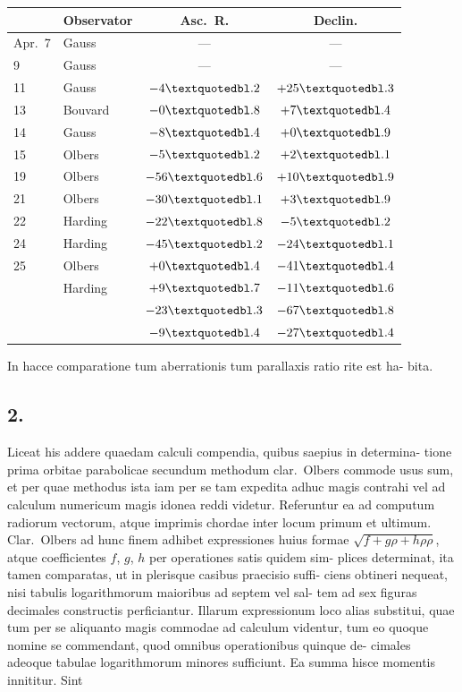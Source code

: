 \documentclass[12pt,a4paper]{article}
\begin{document}
\begin{center}
\small
\begin{tabular}{@{}llcc@{}}
\toprule
& Observator & Asc.\ R. & Declin. \\
\midrule
Apr.\ 7 & Gauss & --- & --- \\
9 & Gauss & --- & --- \\
11 & Gauss & $-4\textquotedbl.2$ & $+25\textquotedbl.3$ \\
13 & Bouvard & $-0\textquotedbl.8$ & $+7\textquotedbl.4$ \\
14 & Gauss & $-8\textquotedbl.4$ & $+0\textquotedbl.9$ \\
15 & Olbers & $-5\textquotedbl.2$ & $+2\textquotedbl.1$ \\
19 & Olbers & $-56\textquotedbl.6$ & $+10\textquotedbl.9$ \\
21 & Olbers & $-30\textquotedbl.1$ & $+3\textquotedbl.9$ \\
22 & Harding & $-22\textquotedbl.8$ & $-5\textquotedbl.2$ \\
24 & Harding & $-45\textquotedbl.2$ & $-24\textquotedbl.1$ \\
25 & Olbers & $+0\textquotedbl.4$ & $-41\textquotedbl.4$ \\
& Harding & $+9\textquotedbl.7$ & $-11\textquotedbl.6$ \\
& & $-23\textquotedbl.3$ & $-67\textquotedbl.8$ \\
& & $-9\textquotedbl.4$ & $-27\textquotedbl.4$ \\
\bottomrule
\end{tabular}
\end{center}

In hacce comparatione tum aberrationis tum parallaxis ratio rite est ha-
bita.

\subsection*{2.}

Liceat his addere quaedam calculi compendia, quibus saepius in determina-
tione prima orbitae parabolicae secundum methodum clar.\ Olbers commode usus
sum, et per quae methodus ista iam per se tam expedita adhuc magis contrahi
vel ad calculum numericum magis idonea reddi videtur. Referuntur ea ad
computum radiorum vectorum, atque imprimis chordae inter locum primum
et ultimum. Clar.\ Olbers ad hunc finem adhibet expressiones huius formae
$\sqrt{f + g\rho + h\rho\rho}$, atque coefficientes $f$, $g$, $h$ per operationes satis quidem sim-
plices determinat, ita tamen comparatas, ut in plerisque casibus praecisio suffi-
ciens obtineri nequeat, nisi tabulis logarithmorum maioribus ad septem vel sal-
tem ad sex figuras decimales constructis perficiantur. Illarum expressionum loco
alias substitui, quae tum per se aliquanto magis commodae ad calculum videntur,
tum eo quoque nomine se commendant, quod omnibus operationibus quinque de-
cimales adeoque tabulae logarithmorum minores sufficiunt. Ea summa hisce
momentis innititur. Sint
\end{document}
